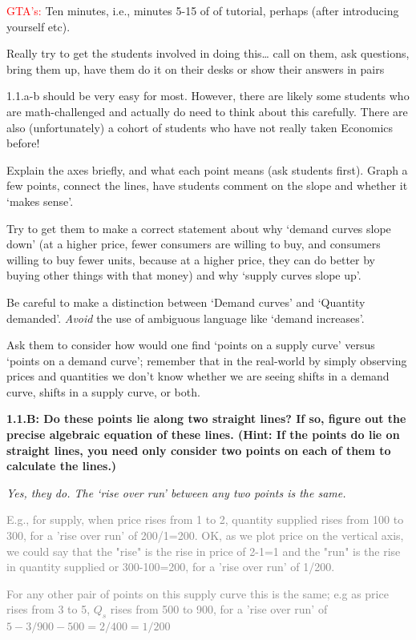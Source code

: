 \documentclass[]{article}
\begin{document}
\textcolor{red}{GTA's:} Ten minutes, i.e., minutes 5-15 of of tutorial,
perhaps (after introducing yourself etc).

Really try to get the students involved in doing this\ldots{} call on
them, ask questions, bring them up, have them do it on their desks or
show their answers in pairs

1.1.a-b should be very easy for most. However, there are likely some
students who are math-challenged and actually do need to think about
this carefully. There are also (unfortunately) a cohort of students who
have not really taken Economics before!

Explain the axes briefly, and what each point means (ask students
first). Graph a few points, connect the lines, have students comment on
the slope and whether it `makes sense'.

Try to get them to make a correct statement about why `demand curves
slope down' (at a higher price, fewer consumers are willing to buy, and
consumers willing to buy fewer units, because at a higher price, they
can do better by buying other things with that money) and why `supply
curves slope up'.

Be careful to make a distinction between `Demand curves' and `Quantity
demanded'. \emph{Avoid} the use of ambiguous language like `demand
increases'.

Ask them to consider how would one find `points on a supply curve'
versus `points on a demand curve'; remember that in the real-world by
simply observing prices and quantities we don't know whether we are
seeing shifts in a demand curve, shifts in a supply curve, or both.

\textbf{1.1.B: Do these points lie along two straight lines? If so,
figure out the precise algebraic equation of these lines. (Hint: If the
points do lie on straight lines, you need only consider two points on
each of them to calculate the lines.) }

\emph{Yes, they do. The `rise over run' between any two points is the
same.}

\textcolor{gray}{E.g., for supply, when price rises from 1 to 2,  quantity supplied rises from 100 to 300, for a 'rise over run' of 200/1=200.
OK, as we plot price on the vertical axis, we could say that the "rise" is the rise in price of 2-1=1 and the "run" is the rise in quantity supplied or 300-100=200, for a 'rise over run' of 1/200.}

\textcolor{gray}{For any other pair of points on this supply curve this is the same; e.g as price rises from 3 to 5, $Q_s$ rises from 500 to 900, for a 'rise over run' of $5-3/900-500 = 2/400=1/200$}
\end{document}
